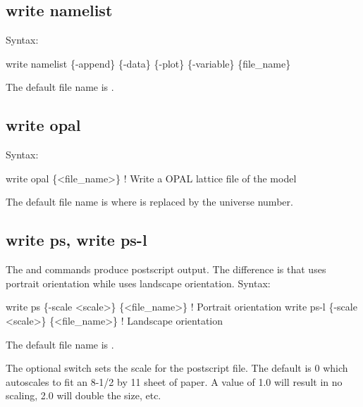 {{{{{{{{{\subsection{write namelist}
\label{s:write.namelist}

Syntax:
\begin{example}
    write namelist \{-append\} \{-data\} \{-plot\} \{-variable\} \{file_name\}
\end{example}

The default file name is .


\subsection{write opal}
\label{s:write.opal}

Syntax:
\begin{example}
    write opal \{<file_name>\}  ! Write a OPAL lattice file of the model
\end{example}

The default file name is  where \vn{\#} is replaced by the universe number. 


\subsection{write ps, write ps-l}
\label{s:write.ps}

The  and  commands produce postscript output. The difference is that
 uses portrait orientation while  uses landscape orientation. Syntax:
\begin{example}
  write ps \{-scale <scale>\} \{<file_name>\}      ! Portrait orientation
  write ps-l \{-scale <scale>\} \{<file_name>\}    ! Landscape orientation
\end{example}

The default file name is . 

The optional  switch sets the scale for the postscript file. The default is 0 which
autoscales to fit an 8-1/2 by 11 sheet of paper. A value of 1.0 will result in no scaling, 2.0 will
double the size, etc.


}}}}}}}}}
